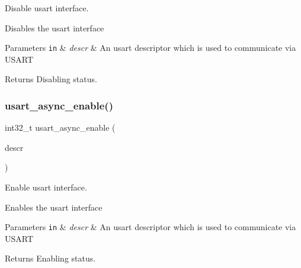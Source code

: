Disable usart interface. 

Disables the usart interface


\begin{DoxyParams}[1]{Parameters}
\mbox{\tt in}  & {\em descr} & An usart descriptor which is used to communicate via U\+S\+A\+RT\\
\hline
\end{DoxyParams}
\begin{DoxyReturn}{Returns}
Disabling status. 
\end{DoxyReturn}
\mbox{\label{group__doc__driver__hal__usart__async_gaa752e7d978b7f3bc35c97f9a7eb5f98a}} 
\subsubsection{\texorpdfstring{usart\+\_\+async\+\_\+enable()}{usart\_async\_enable()}}
{\footnotesize\ttfamily int32\+\_\+t usart\+\_\+async\+\_\+enable (\begin{DoxyParamCaption}\item[{struct \hyperlink{structusart__async__descriptor}{usart\+\_\+async\+\_\+descriptor} $\ast$const}]{descr }\end{DoxyParamCaption})}



Enable usart interface. 

Enables the usart interface


\begin{DoxyParams}[1]{Parameters}
\mbox{\tt in}  & {\em descr} & An usart descriptor which is used to communicate via U\+S\+A\+RT\\
\hline
\end{DoxyParams}
\begin{DoxyReturn}{Returns}
Enabling status. 
\end{DoxyReturn}
\mbox{\label{group__doc__driver__hal__usart__async_gaf451cb5a13be66b9357354b1b503c892}} 
